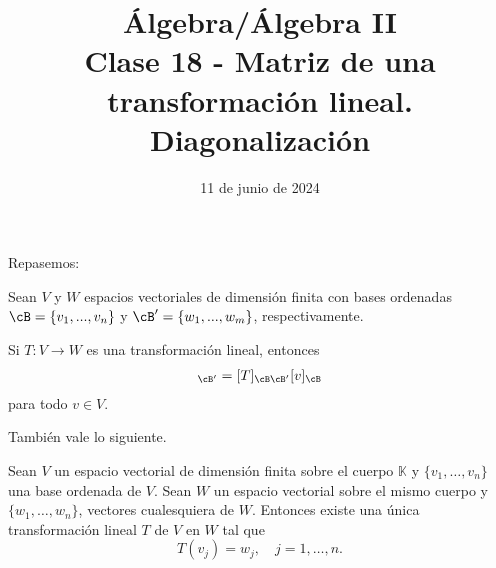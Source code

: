 \documentclass{beamer} %
\title[Clase 18 -  Matriz de una transformación lineal. Diagonalización]{Álgebra/Álgebra II \\Clase 18 -  Matriz de una transformación lineal. Diagonalización}
\author[]{}
\institute[]{\normalsize FAMAF / UNC
    \\[\baselineskip] ${}^{}$
    \\[\baselineskip]
}
\date[11/06/2024]{11 de junio de 2024}
\newcommand{\K}{\mathbb K}
\begin{document}
\begin{frame}
\maketitle
\end{frame}



\begin{frame}
    Repasemos:
    \begin{proposicion}
        Sean $V$ y $W$ espacios vectoriales de dimensión finita con bases ordenadas $\cB=\{v_1, ..., v_n\}$ y $\cB'=\{w_1, ..., w_m\}$, respectivamente. 
        
        Si $T:V\longrightarrow W$ es una transformación lineal, entonces
        \begin{align*}
        [T(v)]_{\cB'}=[T]_{\cB\cB'}[v]_{\cB}
        \end{align*}
        para todo $v\in V$.
    \end{proposicion}

\end{frame}

\begin{frame}

También vale  lo siguiente.
\pause
\begin{teorema}\label{th-tl-definida-en-base}
    Sean $V$ un espacio vectorial de dimensión finita sobre el cuerpo $\K$ y $\{v_1,\ldots,v_n\}$  una base ordenada de $V$. Sean $W$ un espacio vectorial sobre el mismo cuerpo y $\{w_1,\ldots,w_n\}$, vectores cualesquiera de $W$. Entonces existe una única transformación  lineal $T$ de $V$ en $W$ tal que
    \begin{equation*}
    T(v_j) = w_j, \quad j=1,\ldots,n.
    \end{equation*}
\end{teorema}
\vskip 2cm
\end{frame}
\end{document}
